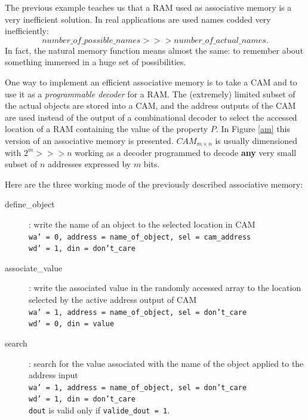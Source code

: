 The previous example teaches us that a RAM used as associative
memory is a very inefficient solution. In real applications are
used names codded very inefficiently:
$$number\_of\_possible\_names >>> number\_of\_actual\_names.$$
In fact, the natural memory function means almost the same: to
remember about something immersed in a huge set of possibilities.

One way to implement an efficient associative memory is to take a
CAM and to use it as a {\em programmable decoder} for a RAM. The
(extremely) limited subset of the actual objects are stored into a
CAM, and the address outputs of the CAM are used instead of the
output of a combinational decoder to select the accessed location
of a RAM containing the value of the property $P$. In Figure
\ref{am} this version of an associative memory is presented.
$CAM_{m \times n}$ is usually dimensioned with $2^{m} >>> n$
working as a decoder programmed to decode {\bf any} very small
subset of $n$ addresses expressed by $m$ bits.


Here are the three working mode of the previously described
associative memory:
\begin{description}
    \item[define\_object]: write the name of an object to the
    selected location in CAM
    \\ {\tt wa' = 0, address = name\_of\_object, sel = cam\_address
    \\ wd' = 1, din = don't\_care}

    \item[associate\_value]: write the associated value in the
    randomly accessed array to the location selected by the active
    address output of CAM
    \\ {\tt wa' = 1, address = name\_of\_object, sel = don't\_care
    \\ wd' = 0, din = value}

    \item[search]: search for the value associated with the name of the object
    applied to the address input
    \\ {\tt wa' = 1, address = name\_of\_object, sel = don't\_care
    \\ wd' = 1, din = don't\_care}
    \\ {\tt dout} is valid only if {\tt valide\_dout = 1}.
\end{description}

